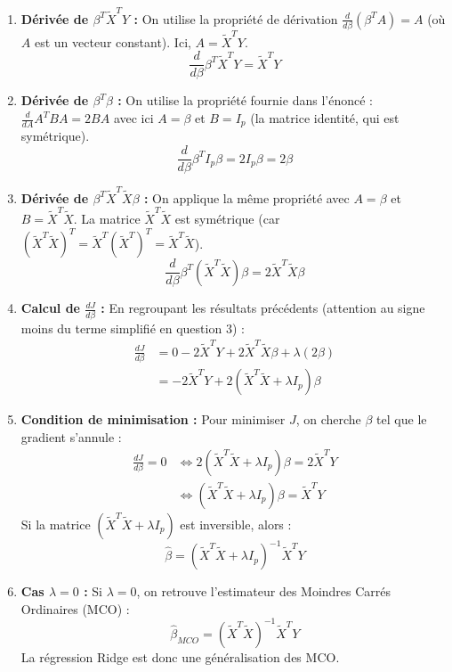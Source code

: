 \documentclass[solutions]{../exercices}
\begin{document}
\begin{solution}
\begin{enumerate}
		\item \textbf{Dérivée de $\beta^T \tilde{X}^T Y$ :}
		On utilise la propriété de dérivation $\frac{d}{d\beta} (\beta^T A) = A$ (où $A$ est un vecteur constant). Ici, $A = \tilde{X}^T Y$.
		\[ \frac{d}{d\beta} \beta^T \tilde{X}^T Y = \tilde{X}^T Y \]

		\item \textbf{Dérivée de $\beta^T \beta$ :}
		On utilise la propriété fournie dans l'énoncé : $\frac{d}{dA} A^T B A = 2BA$ avec ici $A = \beta$ et $B = I_p$ (la matrice identité, qui est symétrique).
		\[ \frac{d}{d\beta} \beta^T I_p \beta = 2 I_p \beta = 2 \beta \]

		\item \textbf{Dérivée de $\beta^T \tilde{X}^T \tilde{X} \beta$ :}
		On applique la même propriété avec $A = \beta$ et $B = \tilde{X}^T \tilde{X}$. La matrice $\tilde{X}^T \tilde{X}$ est symétrique (car $(\tilde{X}^T \tilde{X})^T = \tilde{X}^T (\tilde{X}^T)^T = \tilde{X}^T \tilde{X}$).
		\[ \frac{d}{d\beta} \beta^T (\tilde{X}^T \tilde{X}) \beta = 2 \tilde{X}^T \tilde{X} \beta \]

		\item \textbf{Calcul de $\frac{dJ}{d\beta}$ :}
		En regroupant les résultats précédents (attention au signe moins du terme simplifié en question 3) :
		\[
		\begin{aligned}
			\frac{dJ}{d\beta} &= 0 - 2 \tilde{X}^T Y + 2 \tilde{X}^T \tilde{X} \beta + \lambda (2 \beta) \\
			&= - 2 \tilde{X}^T Y + 2 (\tilde{X}^T \tilde{X} + \lambda I_p) \beta
		\end{aligned}
		\]

		\item \textbf{Condition de minimisation :}
		Pour minimiser $J$, on cherche $\beta$ tel que le gradient s'annule :
		\[
		\begin{aligned}
			\frac{dJ}{d\beta} = 0 &\iff 2 (\tilde{X}^T \tilde{X} + \lambda I_p) \beta = 2 \tilde{X}^T Y \\
			&\iff (\tilde{X}^T \tilde{X} + \lambda I_p) \beta = \tilde{X}^T Y
		\end{aligned}
		\]
		Si la matrice $(\tilde{X}^T \tilde{X} + \lambda I_p)$ est inversible, alors :
		\[ \hat{\beta} = (\tilde{X}^T \tilde{X} + \lambda I_p)^{-1} \tilde{X}^T Y \]

		\item \textbf{Cas $\lambda = 0$ :}
		Si $\lambda = 0$, on retrouve l'estimateur des Moindres Carrés Ordinaires (MCO) :
		\[ \hat{\beta}_{MCO} = (\tilde{X}^T \tilde{X})^{-1} \tilde{X}^T Y \]
		La régression Ridge est donc une généralisation des MCO.
	\end{enumerate}
\end{solution}
\end{document}
